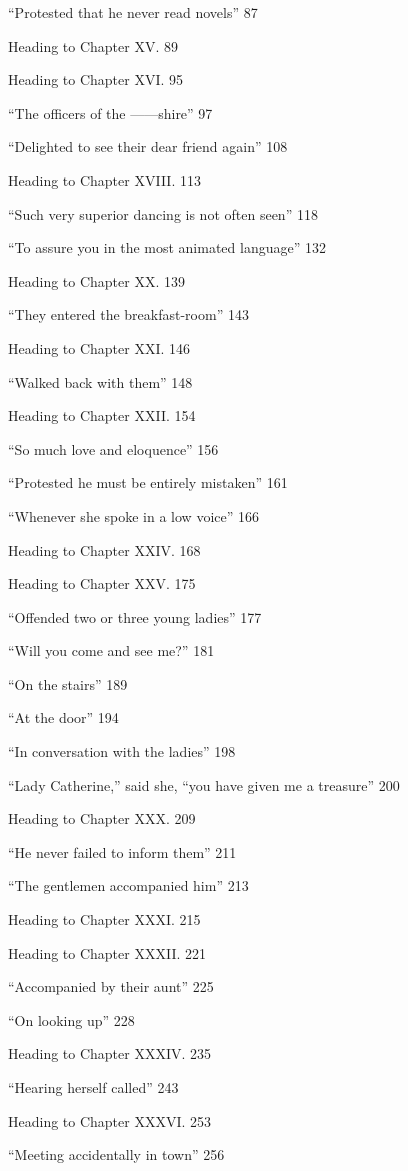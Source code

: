 \documentclass[11pt, statementpaper, twoside, openright]{memoir}
\begin{document}
``Protested that he never read novels'' 87

Heading to Chapter XV. 89

Heading to Chapter XVI. 95

``The officers of the ------shire'' 97

``Delighted to see their dear friend again'' 108

Heading to Chapter XVIII. 113

``Such very superior dancing is not often seen'' 118

``To assure you in the most animated language'' 132

Heading to Chapter XX. 139

``They entered the breakfast-room'' 143

Heading to Chapter XXI. 146

``Walked back with them'' 148

Heading to Chapter XXII. 154

``So much love and eloquence'' 156

``Protested he must be entirely mistaken'' 161

``Whenever she spoke in a low voice'' 166

Heading to Chapter XXIV. 168

Heading to Chapter XXV. 175

``Offended two or three young ladies'' 177

``Will you come and see me?'' 181

``On the stairs'' 189

``At the door'' 194

``In conversation with the ladies'' 198

``Lady Catherine,'' said she, ``you have given me a treasure'' 200

Heading to Chapter XXX. 209

``He never failed to inform them'' 211

``The gentlemen accompanied him'' 213

Heading to Chapter XXXI. 215

Heading to Chapter XXXII. 221

``Accompanied by their aunt'' 225

``On looking up'' 228

Heading to Chapter XXXIV. 235

``Hearing herself called'' 243

Heading to Chapter XXXVI. 253

``Meeting accidentally in town'' 256
\end{document}
